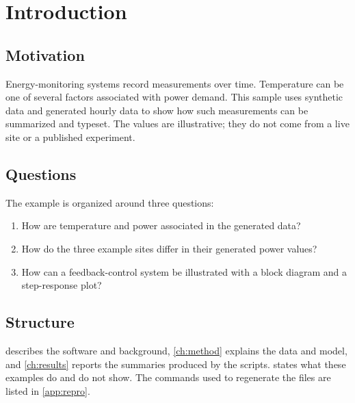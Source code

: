 \chapter{Introduction}

\section{Motivation}
Energy-monitoring systems record measurements over time. Temperature can be one of several factors associated with power demand. This sample uses synthetic data and generated hourly data to show how such measurements can be summarized and typeset. The values are illustrative; they do not come from a live site or a published experiment.

\section{Questions}
The example is organized around three questions:
\begin{enumerate}[label=\textbf{RQ\arabic*.}]
  \item How are temperature and power associated in the generated data?
  \item How do the three example sites differ in their generated power values?
  \item How can a feedback-control system be illustrated with a block diagram and a step-response plot?
\end{enumerate}

\section{Structure}
 describes the software and background, \cref{ch:method} explains the data and model, and \cref{ch:results} reports the summaries produced by the scripts.  states what these examples do and do not show. The commands used to regenerate the files are listed in \cref{app:repro}.
